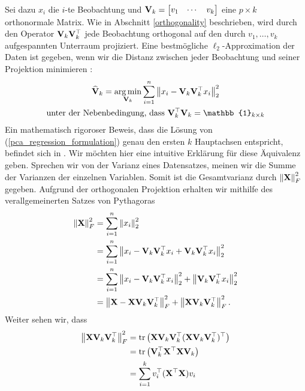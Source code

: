 Sei dazu $x_i$ die $i$-te Beobachtung und $\mathbf{V}_k = \begin{bmatrix} v_1 & \cdots & v_k \end{bmatrix}$ eine $p \times k$ orthonormale Matrix. Wie in Abschnitt \ref{orthogonality} beschrieben, wird durch den Operator $\mathbf{V}_k \mathbf{V}_k^{\top}$ jede Beobachtung orthogonal auf den durch $v_1, \ldots , v_k$ aufgespannten Unterraum projiziert. Eine bestmögliche $\ell_2$-Approximation der Daten ist gegeben, wenn wir die Distanz zwischen jeder Beobachtung und seiner Projektion minimieren \cite{zou_sparsepca}:
\begin{align}
\label{pca_regression_formulation}
\begin{gathered}
\mat{\widehat{V}}_k = \argmin_{\mat{V}_k} \sum_{i=1}^{n} \norm{x_i - \mat{V}_k \mat{V}_k^{\top}x_i}_2^2\\
\text{unter der Nebenbedingung, dass } \mat{V}_k^{\top}\mat{V}_k = \mat{\mathbb{1}}_{k \times k}
\end{gathered}
\end{align}
Ein mathematisch rigoroser Beweis, dass die Lösung von (\ref{pca_regression_formulation}) genau den ersten $k$ Hauptachsen entspricht, befindet sich in \cite{vidal}. Wir möchten hier eine intuitive Erklärung für diese Äquivalenz geben. Sprechen wir von der Varianz eines Datensatzes, meinen wir die Summe der Varianzen der einzelnen Variablen. Somit ist die Gesamtvarianz durch $\left\lVert \mathbf{X} \right\rVert_{F}^{2}$ gegeben. Aufgrund der orthogonalen Projektion erhalten wir mithilfe des verallgemeinerten Satzes von Pythagoras
\begin{align*}
\left\lVert \mathbf{X} \right\rVert_{F}^{2} & = \sum_{i=1}^{n} \left\lVert x_i \right\rVert_{2}^{2}\\
& = \sum_{i=1}^{n} \left\lVert x_i - \mathbf{V}_k \mathbf{V}_k^{\top} x_i + \mathbf{V}_k \mathbf{V}_k^{\top} x_i \right\rVert_{2}^{2}\\
& = \sum_{i=1}^{n} \left\lVert x_i - \mathbf{V}_k \mathbf{V}_k^{\top} x_i \right\rVert_2^2 + \left\lVert \mathbf{V}_k \mathbf{V}_k^{\top} x_i \right\rVert_{2}^{2}\\
& = \left\lVert \mathbf{X} - \mathbf{X} \mathbf{V}_k \mathbf{V}_k^{\top} \right\rVert_{F}^{2} + \left\lVert \mathbf{X} \mathbf{V}_k \mathbf{V}_k^{\top} \right\rVert_{F}^{2}.
\end{align*}
Weiter sehen wir, dass
\begin{align*}
\left\lVert \mathbf{X} \mathbf{V}_k \mathbf{V}_k^{\top} \right\rVert_{F}^{2} & = \text{tr} \left( \mathbf{X} \mathbf{V}_k \mathbf{V}_k^{\top} (\mathbf{X} \mathbf{V}_k \mathbf{V}_k^{\top})^{\top} \right)\\
& = \text{tr} \left( \mathbf{V}_k^{\top} \mathbf{X}^{\top} \mathbf{X} \mathbf{V}_k \right)\\
& = \sum_{i=1}^{k} v_i^{\top} (\mathbf{X}^{\top} \mathbf{X}) v_i
\end{align*}
